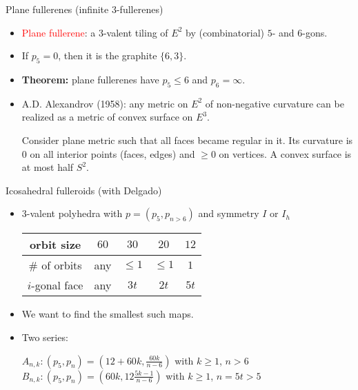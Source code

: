 \documentclass[%
pdf,
colorBG,
slideColor,
]{prosper}
\begin{document}
\begin{slide}{Plane fullerenes (infinite $3$-fullerenes)}
\begin{itemize}
\item \textcolor{red}{Plane fullerene}: a $3$-valent
tiling of $E^2$ by (combinatorial) $5$- and $6$-gons.
\item If $p_5=0$, then it is the graphite $\{6,3\}$.
\item {\bf Theorem:} plane fullerenes have
$p_5 \leq 6$ and $p_6=\infty$.
\item A.D. Alexandrov (1958): any metric on $E^2$ of
non-negative curvature can be realized as a metric of
convex surface on $E^3$.\par

Consider plane metric such that
all faces became regular in it. Its curvature is $0$ on all
interior points (faces, edges) and $\geq 0$ on vertices. A convex
surface is at most half $S^2$.
\end{itemize}

\end{slide}










\begin{slide}{Icosahedral fulleroids (with Delgado)}
\begin{itemize}
\item $3$-valent polyhedra with $p=(p_5, p_{n>6})$ and symmetry $I$ or $I_h$
\begin{center}
\begin{tabular}{|c|c|c|c|c|}
\hline
orbit size & $60$ & $30$ & $20$ & $12$\\
\hline
\# of orbits &any & $\leq 1$& $\leq 1$& $1$\\
\hline
$i$-gonal face &any & $3t$ &$2t$ & $5t$\\
\hline
\end{tabular}
\end{center}
\item We want to find the smallest such maps.
\item Two series:

$A_{n,k} : (p_5, p_n)=(12+60k, \frac{60k}{n-6})$ with $k\geq 1$, $n>6$\\

$B_{n,k} : (p_5, p_n)=(60k, 12\frac{5k-1}{n-6})$ with $k\geq 1$, $n=5t>5$
\end{itemize}
\end{slide}
\end{document}
